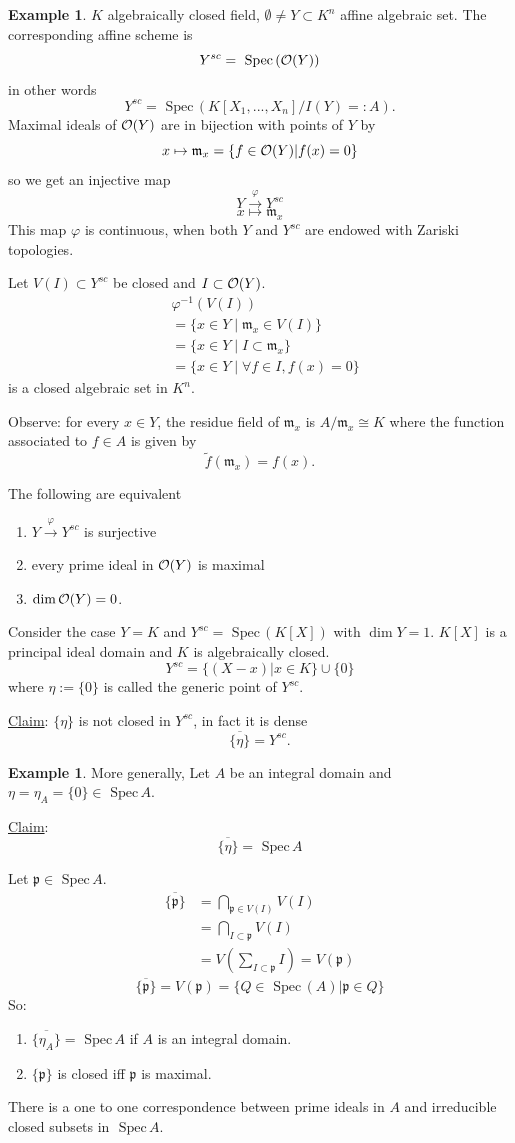 \documentclass[11pt]{article}
\theoremstyle{definition}
\newtheorem{ex}[thm]{Example}
\newcommand{\spec}{\text{ Spec}\,}
\newcommand{\scm}{{\mathfrak m}}
\newcommand{\scp}{{\mathfrak p}}
\newcommand{\calo}{{\cal O}}
\newcommand{\lrta}{\longrightarrow}
\begin{document}
\begin{ex}\label{ex:K-algebra}
$K$ algebraically closed field, $\emptyset\neq Y\subset K^n$ affine algebraic set. The corresponding  affine scheme is 
$$
Y^{sc}
=\spec (\calo(Y))$$
in other words
$$
Y^{sc}=\spec (K[X_1,...,X_n]/I(Y)=:A).
$$
Maximal ideals of $\calo(Y)$ are in bijection with points of $Y$ by 
$$
x\mapsto \scm_x=\{f\in\calo(Y)|f(x)=0\}
$$
so we get an injective map
$$
Y\overset{\varphi}{\lrta} Y^{sc}
$$
$$
x\longmapsto \scm_x
$$
This map $\varphi$ is continuous, when both $Y$ and $Y^{sc}$ are endowed with Zariski topologies.

Let $V(I)\subset Y^{sc}$ be closed and $I\subset \calo(Y)$.
$$
\begin{aligned}
&\varphi^{-1}(V(I))\\
&=\{x\in Y\mid \scm_x\in V(I)\}\\
&=\{x\in Y\mid I\subset\scm_x\}\\
&=\{x\in Y\mid \forall f\in I, f(x)=0\}
\end{aligned}
$$
is a closed algebraic set in $K^n$.

Observe: for every $x\in Y$, the residue field of $\scm_x$ is $A/\scm_x \cong K$ where the function associated to $f\in A$ is given by 
$$
\tilde{f}(\scm_x)=f(x).
$$

The following are equivalent
\begin{enumerate}
\item $Y\overset{\varphi}{\lrta} Y^{sc}$ is surjective
\item every prime ideal in $\calo(Y)$ is maximal
\item $\dim \calo(Y) = 0$.
\end{enumerate}
Consider the case $Y=K$ and $Y^{sc}=\spec (K[X])$ with $\dim Y=1$.
$K[X]$ is a principal ideal domain and $K$ is algebraically closed.
$$
Y^{sc}=\{(X-x)|x\in K\}\cup \{0\}
$$
where $\eta:=\{0\}$ is called the generic point of $Y^{sc}$.

\underline{Claim}: $\{\eta\}$ is not closed in $Y^{sc}$, in fact it is dense
$$
\overline{\{\eta\}}=Y^{sc}.
$$
\end{ex}

\begin{ex}
More generally, Let $A$ be an integral domain and $\eta=\eta_A=\{0\}\in\spec A$.

\underline{Claim}: 
$$
\overline{\{\eta\}}=\spec A
$$

Let $\scp\in\spec A$.
$$
\begin{aligned}
\overline{\{\scp\}}&=\bigcap_{\scp\in V(I)}V(I)\\
&=\bigcap_{I\subset \scp}V(I)\\
&=V(\sum_{I\subset\scp} I )=V(\scp)
\end{aligned}
$$
$$
\overline{\{\scp\}}=V(\scp)=\{Q\in\spec(A)|\scp\in Q\}
$$
So:
\begin{enumerate}
\item $\overline{\{\eta_A\}}=\spec A$ if $A$ is an integral domain.
\item $\{\scp\}$ is closed iff $\scp$ is maximal.
\end{enumerate}
There is a one to one correspondence between prime ideals in $A$ and irreducible closed subsets in $\spec A$.
\end{ex}
\end{document}
